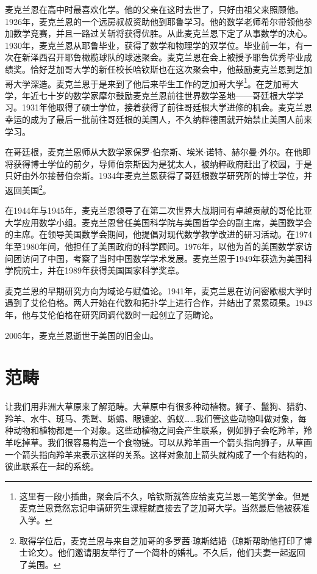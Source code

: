 \documentclass[b5paper]{ctexart}
\begin{document}
麦克兰恩在高中时最喜欢化学。他的父亲在这时去世了，只好由祖父来照顾他。1926年，麦克兰恩的一个远房叔叔资助他到耶鲁学习。他的数学老师希尔带领他参加数学竞赛，并且一路过关斩将获得优胜。从此麦克兰恩下定了从事数学的决心。1930年，麦克兰恩从耶鲁毕业，获得了数学和物理学的双学位。毕业前一年，有一次在新泽西召开耶鲁橄榄球队的球迷聚会。麦克兰恩在会上被授予耶鲁优秀毕业成绩奖\cite{Wiki-Mac-Lane}。恰好芝加哥大学的新任校长哈钦斯也在这次聚会中，他鼓励麦克兰恩到芝加哥大学深造。麦克兰恩于是来到了他后来毕生工作的芝加哥大学\footnote{这里有一段小插曲，聚会后不久，哈钦斯就答应给麦克兰恩一笔奖学金。但是麦克兰恩竟然忘记申请研究生课程就直接去了芝加哥大学。当然最后他被获准入学。}。在芝加哥大学，年近七十岁的数学家摩尔鼓励麦克兰恩前往世界数学圣地——哥廷根大学学习。1931年他取得了硕士学位，接着获得了前往哥廷根大学进修的机会。麦克兰恩幸运的成为了最后一批前往哥廷根的美国人，不久纳粹德国就开始禁止美国人前来学习。

在哥廷根，麦克兰恩师从大数学家保罗$\cdot$伯奈斯、埃米$\cdot$诺特、赫尔曼$\cdot$外尔。在他即将获得博士学位的前夕，导师伯奈斯因为是犹太人，被纳粹政府赶出了校园，于是只好由外尔接替伯奈斯。1934年麦克兰恩获得了哥廷根数学研究所的博士学位，并返回美国\footnote{取得学位后，麦克兰恩与来自芝加哥的多罗茜$\cdot$琼斯结婚（琼斯帮助他打印了博士论文）。他们邀请朋友举行了一个简朴的婚礼。不久后，他们夫妻一起返回了美国。}。

在1944年与1945年，麦克兰恩领导了在第二次世界大战期间有卓越贡献的哥伦比亚大学应用数学小组。麦克兰恩曾任美国科学院与美国哲学会的副主席，美国数学会的主席。在领导美国数学会期间，他提倡对现代数学教学改进的研习活动。在1974年至1980年间，他担任了美国政府的科学顾问。1976年，以他为首的美国数学家访问团访问了中国，考察了当时中国数学学术发展。麦克兰恩于1949年获选为美国科学院院士，并在1989年获得美国国家科学奖章。

麦克兰恩的早期研究方向为域论与赋值论。1941年，麦克兰恩在访问密歇根大学时遇到了艾伦伯格。两人开始在代数和拓扑学上进行合作，并结出了累累硕果。1943年，他与艾伦伯格在研究同调代数时一起创立了范畴论。

2005年，麦克兰恩逝世于美国的旧金山。

\section{范畴}

让我们用非洲大草原来了解范畴。大草原中有很多种动植物。狮子、鬣狗、猎豹、羚羊、水牛、斑马、秃鹫、蜥蜴、眼镜蛇、蚂蚁……我们管这些动物叫做对象，每种动物和植物都是一个对象。这些动植物之间会产生联系，例如狮子会吃羚羊，羚羊吃掉草。我们很容易构造一个食物链。可以从羚羊画一个箭头指向狮子，从草画一个箭头指向羚羊来表示这样的关系。这样对象加上箭头就构成了一个有结构的，彼此联系在一起的系统。
\end{document}

